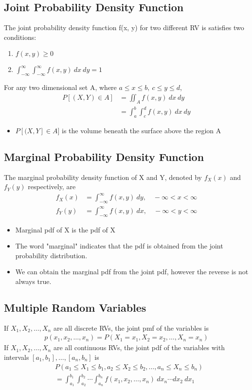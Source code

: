 \documentclass[a4paper]{article}
\begin{document}
\subsection{Joint Probability Density Function}
The joint probability density function f(x, y) for two different RV is satisfies two conditions:
\begin{enumerate}
    \item $f(x, y) \geq 0$ 
    \item $\int_{-\infty}^{\infty}\int_{-\infty}^{\infty}f(x, y) \ dx \ dy = 1$
\end{enumerate}
For any two dimensional set A, where $a \leq x \leq b,\  c \leq y \leq d$,
\begin{align*}
    P[(X, Y) \in A] &= \iint_{A}f(x, y) \ dx \ dy\\
    &= \int_{a}^{b}\int_{c}^{d}f(x, y) \ dx \ dy
\end{align*}
\begin{itemize}
    \item $P[(X, Y] \in A]$ is the volume beneath the surface above the region A
\end{itemize}
\subsection{Marginal Probability Density Function}
The marginal probability density function of X and Y, denoted by $f_{X}(x)$ and $f_{Y}(y)$ respectively, are
\begin{align*}
    f_{X}(x) &= \int_{-\infty}^{\infty}f(x, y) \ dy, \quad -\infty< x< \infty\\
    f_{Y}(y) &= \int_{-\infty}^{\infty}f(x, y) \ dx, \quad -\infty< y< \infty
\end{align*}
\begin{itemize}
    \item Marginal pdf of X is the pdf of X
    \item The word "marginal" indicates that the pdf is obtained from the joint probability distribution.
    \item We can obtain the marginal pdf from the joint pdf, however the reverse is not always true.
\end{itemize}
\subsection{Multiple Random Variables}
If $X_{1}, X_{2}, \ldots, X_{n}$ are all discrete RVs, the joint pmf of the variables is
\begin{align*}
    p(x_{1}, x_{2}, \ldots, x_{n}) = P(X_{1} = x_{1}, X_{2} = x_{2}, \ldots, X_{n} = x_{n})
\end{align*}
If $X_{1}, X_{2}, \ldots, X_{n}$ are all continuous RVs, the joint pdf of the variables with intervals $[a_{1}, b_{1}], \ldots, [a_{n}, b_{n}]$ is 
\begin{align*}
    &P(a_{1}\leq X_{1} \leq b_{1},a_{2}\leq X_{2} \leq b_{2},\ldots, a_{n}\leq X_{n} \leq b_{n})\\
    &= \int_{a_{1}}^{b_{1}}\int_{a_{2}}^{b_{2}}\cdots\int_{a_{n}}^{b_{n}}f(x_{1}, x_{2}, \ldots, x_{n}) \ dx_{n} \cdots dx_{2} \ dx_{1}
\end{align*}
\end{document}
